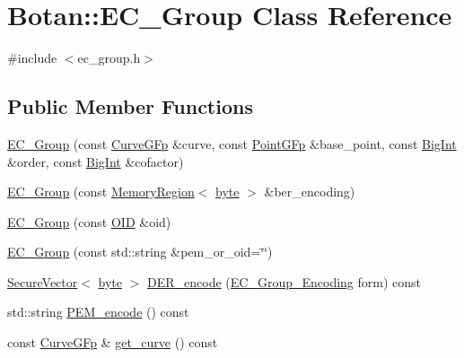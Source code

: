 \hypertarget{classBotan_1_1EC__Group}{\section{Botan\-:\-:E\-C\-\_\-\-Group Class Reference}
\label{classBotan_1_1EC__Group}
}


{\ttfamily \#include $<$ec\-\_\-group.\-h$>$}

\subsection*{Public Member Functions}
\begin{DoxyCompactItemize}
\item 
\hyperlink{classBotan_1_1EC__Group_afbb27ab7cf957cf713531e4271da65cb}{E\-C\-\_\-\-Group} (const \hyperlink{classBotan_1_1CurveGFp}{Curve\-G\-Fp} \&curve, const \hyperlink{classBotan_1_1PointGFp}{Point\-G\-Fp} \&base\-\_\-point, const \hyperlink{classBotan_1_1BigInt}{Big\-Int} \&order, const \hyperlink{classBotan_1_1BigInt}{Big\-Int} \&cofactor)
\item 
\hyperlink{classBotan_1_1EC__Group_a5de280bf2bfd33779914c94bfb388cfa}{E\-C\-\_\-\-Group} (const \hyperlink{classBotan_1_1MemoryRegion}{Memory\-Region}$<$ \hyperlink{namespaceBotan_a7d793989d801281df48c6b19616b8b84}{byte} $>$ \&ber\-\_\-encoding)
\item 
\hyperlink{classBotan_1_1EC__Group_aadd3cad8dff5b9207f13f26327d6ceae}{E\-C\-\_\-\-Group} (const \hyperlink{classBotan_1_1OID}{O\-I\-D} \&oid)
\item 
\hyperlink{classBotan_1_1EC__Group_a6f5cabb283056b643b6e7b4785c177ac}{E\-C\-\_\-\-Group} (const std\-::string \&pem\-\_\-or\-\_\-oid=\char`\"{}\char`\"{})
\item 
\hyperlink{classBotan_1_1SecureVector}{Secure\-Vector}$<$ \hyperlink{namespaceBotan_a7d793989d801281df48c6b19616b8b84}{byte} $>$ \hyperlink{classBotan_1_1EC__Group_af4a37794588f918fec6df55333ab8cea}{D\-E\-R\-\_\-encode} (\hyperlink{namespaceBotan_ad0ee6307c8f311388a2bc00426a7f858}{E\-C\-\_\-\-Group\-\_\-\-Encoding} form) const 
\item 
std\-::string \hyperlink{classBotan_1_1EC__Group_a65471ea8260f5348e1664476ae0a06f9}{P\-E\-M\-\_\-encode} () const 
\item 
const \hyperlink{classBotan_1_1CurveGFp}{Curve\-G\-Fp} \& \hyperlink{classBotan_1_1EC__Group_af9e5beae6a59d527ff834169063468f6}{get\-\_\-curve} () const 
\item 

\end{DoxyCompactItemize}
